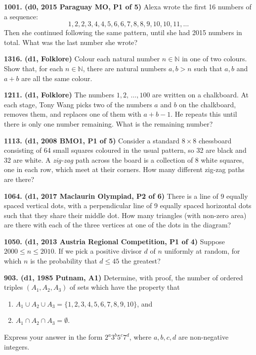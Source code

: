 \documentclass{article}
\begin{document}
\textbf{1001. (\color{red}d0\color{black}, 2015 Paraguay MO, P1 of 5)} Alexa wrote the first 16 numbers of a sequence: \begin{equation*}1, 2, 2, 3, 4, 4, 5, 6, 6, 7, 8, 8, 9, 10, 10, 11, \dots\end{equation*} Then she continued following the same pattern, until she had 2015 numbers in total. What was the last number she wrote?

\textbf{1316. (\color{red}d1\color{black}, Folklore)} Colour each natural number $n \in \mathbb{N}$ in one of two colours. Show that, for each $n \in \mathbb{N}$, there are natural numbers $a, b > n$ such that $a, b$ and $a + b$ are all the same colour.

\textbf{1211. (\color{red}d1\color{black}, Folklore)} The numbers $1, 2,\, \dots, 100$ are written on a chalkboard. At each stage, Tony Wang picks two of the numbers $a$ and $b$ on the chalkboard, removes them, and replaces one of them with $a + b - 1$. He repeats this until there is only one number remaining. What is the remaining number?

\textbf{1113. (\color{red}d1\color{black}, 2008 BMO1, P1 of 5)} Consider a standard $8 \times 8$ chessboard consisting of 64 small squares coloured in the usual pattern, so 32 are black and 32 are white. A \emph{zig-zag} path across the board is a collection of 8 white squares, one in each row, which meet at their corners. How many different zig-zag paths are there?

\textbf{1064. (\color{red}d1\color{black}, 2017 Maclaurin Olympiad, P2 of 6)} There is a line of 9 equally spaced vertical dots, with a perpendicular line of 9 equally spaced horizontal dots such that they share their middle dot. How many triangles (with non-zero area) are there with each of the three vertices at one of the dots in the diagram?

\textbf{1050. (\color{red}d1\color{black}, 2013 Austria Regional Competition, P1 of 4)} Suppose $2000 \le n \le  2010$. If we pick a positive divisor $d$ of $n$ uniformly at random, for which $n$ is the probability that $d \le 45$ the greatest?

\textbf{903. (\color{red}d1\color{black}, 1985 Putnam, A1)} Determine, with proof, the number of ordered triples $(A_1, A_2, A_3)$ of sets which have the property that \begin{enumerate}\item{$A_1 \cup A_2 \cup A_3 = \{1,2,3,4,5,6,7,8,9,10\}$, and}\item{$A_1 \cap A_2 \cap A_3 = \emptyset$.}\end{enumerate} Express your answer in the form $2^a3^b5^c7^d$, where $a,b,c,d$ are non-negative integers.
\end{document}

